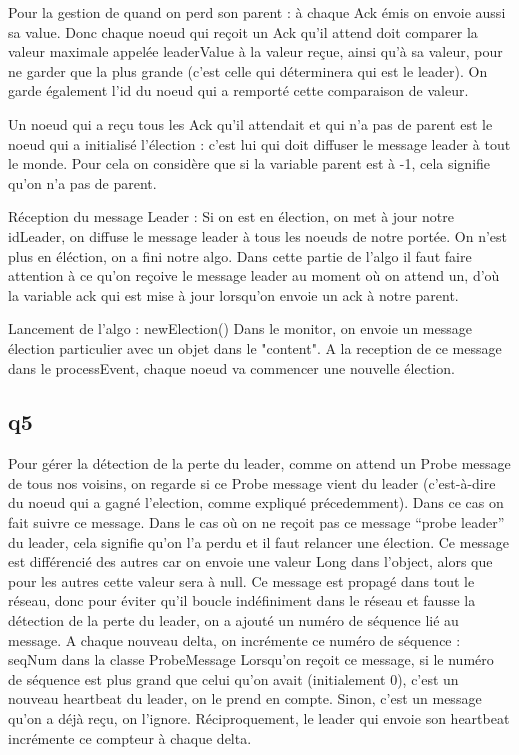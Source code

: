 \documentclass[paper=a4, fontsize=11pt]{article} %
\begin{document}
Pour la gestion de quand on perd son parent : à chaque Ack émis on envoie aussi sa value. Donc chaque noeud qui reçoit un Ack qu'il attend doit comparer la valeur maximale appelée leaderValue à la valeur reçue, ainsi qu'à sa valeur, pour ne garder que la plus grande (c'est celle qui déterminera qui est le leader). On garde également l'id du noeud qui a remporté cette comparaison de valeur.

Un noeud qui a reçu tous les Ack qu'il attendait et qui n'a pas de parent est le noeud qui a initialisé l'élection : c'est lui qui doit diffuser le message leader à tout le monde. Pour cela on considère que si la variable parent est à -1, cela signifie qu'on n'a pas de parent.

Réception du message Leader :
Si on est en élection, on met à jour notre idLeader, on diffuse le message leader à tous les noeuds de notre portée. On n'est plus en éléction, on a fini notre algo.
Dans cette partie de l'algo il faut faire attention à ce qu'on reçoive le message leader au moment où on attend un, d'où la variable ack qui est mise à jour lorsqu'on envoie un ack à notre parent.


Lancement de l'algo : newElection()
Dans le monitor, on envoie un message élection particulier avec un objet dans le "content". A la reception de ce message dans le processEvent, chaque noeud va commencer une nouvelle élection.
\subsection{q5}

Pour gérer la détection de la perte du leader, comme on attend un Probe message de tous nos voisins, on regarde si ce Probe message vient du leader (c'est-à-dire du noeud qui a gagné l'election, comme expliqué précedemment).
Dans ce cas on fait suivre ce message.
Dans le cas où on ne reçoit pas ce message \enquote{probe leader} du leader, cela signifie qu'on l'a perdu et il faut relancer une élection.
Ce message est différencié des autres car on envoie une valeur Long dans l'object, alors que pour les autres cette valeur sera à null.
Ce message est propagé dans tout le réseau, donc pour éviter qu'il boucle indéfiniment dans le réseau et fausse la détection de la perte du leader, on a ajouté un numéro de séquence lié au message.
A chaque nouveau delta, on incrémente ce numéro de séquence : seqNum dans la classe ProbeMessage
Lorsqu'on reçoit ce message, si le numéro de séquence est plus grand que celui qu'on avait (initialement 0), c'est un nouveau heartbeat du leader, on le prend en compte.
Sinon, c'est un message qu'on a déjà reçu, on l'ignore. Réciproquement, le leader qui envoie son heartbeat incrémente ce compteur à chaque delta.


\end{document}
